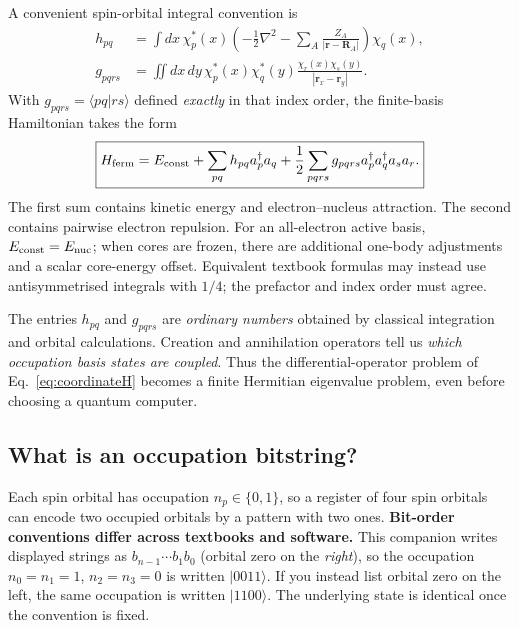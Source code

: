 \documentclass[11pt,a4paper,oneside]{report}
\newcommand{\ket}[1]{\lvert #1\rangle}
\begin{document}
A convenient spin-orbital integral convention is
\begin{align}
 h_{pq}&=\int\!dx\,\chi_p^*(x)
 \left(-\tfrac12\nabla^2-\sum_A\frac{Z_A}{|\mathbf r-\mathbf R_A|}\right)\chi_q(x),\\
 g_{pqrs}&=\iint\!dx\,dy\,\chi_p^*(x)\chi_q^*(y)
 \frac{\chi_r(x)\chi_s(y)}{|\mathbf r_x-\mathbf r_y|}.
\end{align}
With $g_{pqrs}=\langle pq|rs\rangle$ defined \emph{exactly} in that index order, the finite-basis Hamiltonian takes the form
\begin{equation}\label{eq:fermionH}
\boxed{\displaystyle H_{\rm ferm}=E_{\rm const}
+\sum_{pq}h_{pq}a_p^\dagger a_q
+\frac12\sum_{pqrs}g_{pqrs}a_p^\dagger a_q^\dagger a_s a_r.}
\end{equation}
The first sum contains kinetic energy and electron--nucleus attraction. The second contains pairwise electron repulsion. For an all-electron active basis, $E_{\rm const}=E_{\rm nuc}$; when cores are frozen, there are additional one-body adjustments and a scalar core-energy offset. Equivalent textbook formulas may instead use antisymmetrised integrals with $1/4$; the prefactor and index order must agree.

\begin{idea}
The entries $h_{pq}$ and $g_{pqrs}$ are \emph{ordinary numbers} obtained by classical integration and orbital calculations. Creation and annihilation operators tell us \emph{which occupation basis states are coupled}. Thus the differential-operator problem of Eq.~\eqref{eq:coordinateH} becomes a finite Hermitian eigenvalue problem, even before choosing a quantum computer.
\end{idea}

\subsection{What is an occupation bitstring?}
Each spin orbital has occupation $n_p\in\{0,1\}$, so a register of four spin orbitals can encode two occupied orbitals by a pattern with two ones. \textbf{Bit-order conventions differ across textbooks and software.} This companion writes displayed strings as $b_{n-1}\cdots b_1b_0$ (orbital zero on the \emph{right}), so the occupation $n_0=n_1=1$, $n_2=n_3=0$ is written $\ket{0011}$. If you instead list orbital zero on the left, the same occupation is written $\ket{1100}$. The underlying state is identical once the convention is fixed.
\end{document}
